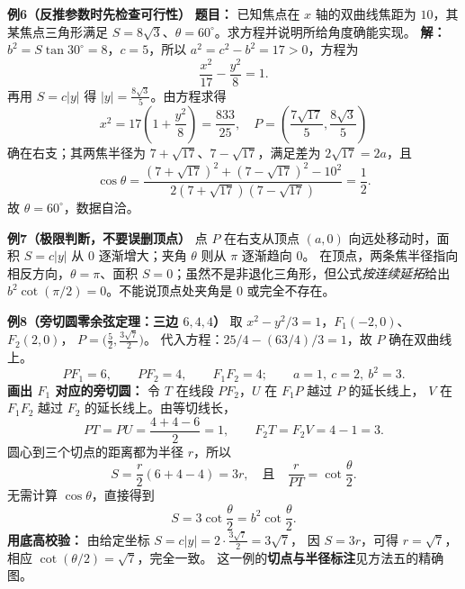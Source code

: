 \clearpage
\begin{examplebox}
\textbf{\textcolor{CExample}{例6（反推参数时先检查可行性）}}
\textbf{题目：} 已知焦点在 $x$ 轴的双曲线焦距为 $10$，其某焦点三角形满足 $S=8\sqrt3$、$\theta=60^\circ$。求方程并说明所给角度确能实现。
\textbf{解：} $b^2=S\tan30^\circ=8$，$c=5$，所以 $a^2=c^2-b^2=17>0$，方程为
\[
\boxed{\frac{x^2}{17}-\frac{y^2}{8}=1}.
\]
再用 $S=c|y|$ 得 $|y|=\frac{8\sqrt3}{5}$。由方程求得
\[
x^2=17\left(1+\frac{y^2}{8}\right)=\frac{833}{25},
\quad P=\left(\frac{7\sqrt{17}}5,\frac{8\sqrt3}5\right)
\]
确在右支；其两焦半径为 $7+\sqrt{17}$、$7-\sqrt{17}$，满足差为 $2\sqrt{17}=2a$，且
\[
\cos\theta=\frac{(7+\sqrt{17})^2+(7-\sqrt{17})^2-10^2}
{2(7+\sqrt{17})(7-\sqrt{17})}=\frac12.
\]
故 $\theta=60^\circ$，数据自洽。

\medskip
\textbf{\textcolor{CExample}{例7（极限判断，不要误删顶点）}}
点 $P$ 在右支从顶点 $(a,0)$ 向远处移动时，面积 $S=c|y|$ 从 $0$ 逐渐增大；夹角 $\theta$ 则从 $\pi$ 逐渐趋向 $0$。
在顶点，两条焦半径指向相反方向，$\theta=\pi$、面积 $S=0$；虽然不是非退化三角形，但公式\emph{按连续延拓}给出 $b^2\cot(\pi/2)=0$。不能说顶点处夹角是 $0$ 或完全不存在。

\end{examplebox}

\clearpage
\begin{examplebox}
\textbf{\textcolor{CExample}{例8（旁切圆零余弦定理：三边 $6,4,4$）}}
取 $x^2-y^2/3=1$，$F_1(-2,0)$、$F_2(2,0)$，
$P=\bigl(\tfrac52,\tfrac{3\sqrt7}2\bigr)$。
代入方程：$25/4-(63/4)/3=1$，故 $P$ 确在双曲线上。
\[
 PF_1=6,\qquad PF_2=4,\qquad F_1F_2=4;
 \qquad a=1,\ c=2,\ b^2=3.
\]
\textbf{画出 $F_1$ 对应的旁切圆：} 令 $T$ 在线段 $PF_2$，$U$ 在 $F_1P$ 越过 $P$ 的延长线上，
$V$ 在 $F_1F_2$ 越过 $F_2$ 的延长线上。由等切线长，
\[
 PT=PU=\frac{4+4-6}{2}=\boxed{1},\qquad
 F_2T=F_2V=4-1=3.
\]
圆心到三个切点的距离都为半径 $r$，所以
\[
 S=\frac r2(6+4-4)=3r,
 \quad\text{且}\quad
 \frac r{PT}=\cot\frac\theta2.
\]
无需计算 $\cos\theta$，直接得到
\[
 S=3\cot\frac\theta2=b^2\cot\frac\theta2.
\]
\textbf{用底高校验：} 由给定坐标 $S=c|y|=2\cdot\tfrac{3\sqrt7}{2}=3\sqrt7$，
因 $S=3r$，可得 $r=\sqrt7$，相应 $\cot(\theta/2)=\sqrt7$，完全一致。
这一例的\textbf{切点与半径标注}见方法五的精确图。
\end{examplebox}
